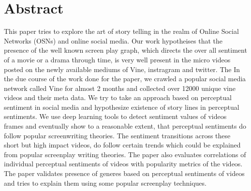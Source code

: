 \section{Abstract}
This paper tries to explore the art of story telling in the realm of Online Social Networks (OSNs) and online social media. Our work hypotheises that the presence of the well known screen play graph, which directs the over all sentiment of a movie or a drama through time, is very well present in the micro videos posted on the newly available mediums of Vine, instragram and twitter. The In the due course of the work done for the paper, we crawled a popular social media network called Vine for almost 2 months and collected over 12000 unique vine videos and their meta data. We try to take an approach based on perceptual sentiment in social media and hypothesize existence of story lines in perceptual sentiments. We use deep learning tools to detect sentiment values of videos frames and eventually show to a reasonable extent, that perceptual sentiments do follow popular screenwriting theories. The sentiment transitions across these short but high impact videos, do follow certain trends which could be explained from popular screenplay writing theories. The paper also evaluates correlations of individual perceptual sentiments of videos with popularity metrics of the videos. The paper validates presence of generes based on perceptual sentiments of videos and tries to explain them using some popular screenplay techniques.